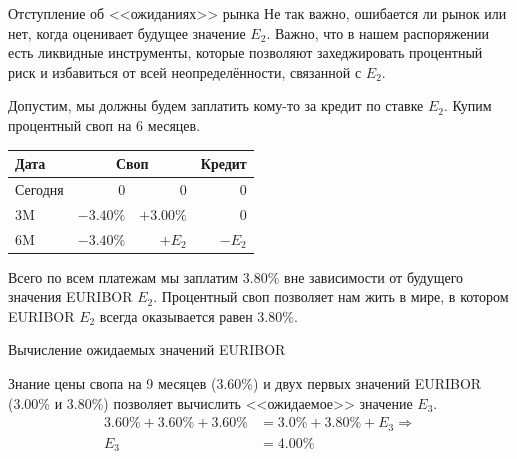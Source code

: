 \documentclass{beamer}
\begin{document}
\begin{frame}{Отступление об <<ожиданиях>> рынка}
\justify
Не так важно, ошибается ли рынок или нет, когда оценивает будущее значение $E_2$. Важно, что в нашем распоряжении есть ликвидные инструменты, которые позволяют захеджировать процентный риск и избавиться от всей неопределённости, связанной с $E_2$.

\justify
Допустим, мы должны будем заплатить кому-то за кредит по ставке $E_2$. Купим процентный своп на 6 месяцев.

\centering
\begin{tabular}{l|r|r|r}
Дата    & \multicolumn{2}{c|}{Своп} & Кредит \\ \hline
Сегодня &          0  &  0            & 0 \\
3M      & $-3.40\%$  &  $+3.00\%$   & 0 \\
6M      & $-3.40\%$  &  $+E_2$       & $-E_2$
\end{tabular}

\justify
Всего по всем платежам мы заплатим $3.80\%$ вне зависимости от будущего значения EURIBOR $E_2$. Процентный своп позволяет нам жить в мире, в котором EURIBOR $E_2$ всегда оказывается равен $3.80\%$.
\end{frame}



\begin{frame}{Вычисление ожидаемых значений EURIBOR}
\centering
{}

\justify
Знание цены свопа на 9 месяцев (3.60\%) и двух первых значений EURIBOR (3.00\% и 3.80\%) позволяет вычислить <<ожидаемое>> значение $E_3$.
\begin{align*}
3.60\% + 3.60\% + 3.60\% &= 3.0\% + 3.80\% + E_3 \Rightarrow \\
E_3 &= 4.00\%
\end{align*}
\end{frame}
\end{document}
